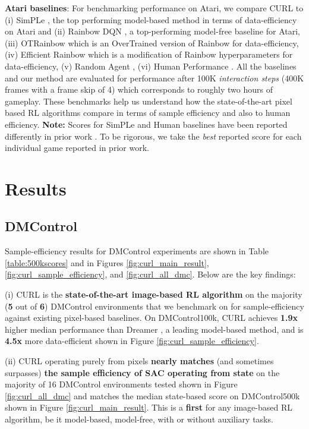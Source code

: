 \documentclass{article}
\begin{document}
\textbf{Atari baselines}: For benchmarking performance on Atari, we compare CURL to (i) SimPLe \cite{kaiser2019model}, the top performing model-based method in terms of data-efficiency on Atari and (ii) Rainbow DQN \cite{hessel2017rainbow}, a top-performing model-free baseline for Atari, (iii) OTRainbow \cite{kielak2020rainbow} which is an OverTrained version of Rainbow for data-efficiency, (iv) Efficient Rainbow \cite{van2019use} which is a modification of Rainbow hyperparameters for data-efficiency, (v) Random Agent \cite{kaiser2019model}, (vi) Human Performance \cite{kaiser2019model, van2019use}. All the baselines and our method are evaluated for performance after 100K {\it interaction steps} (400K frames with a frame skip of 4) which corresponds to roughly two hours of gameplay. These benchmarks help us understand how the state-of-the-art pixel based RL algorithms compare in terms of sample efficiency and also to human efficiency. {\textbf{Note:}} Scores for SimPLe and Human baselines have been reported differently in prior work \cite{kielak2020rainbow, van2019use}. To be rigorous, we take the {\it best} reported score for each individual game reported in prior work. 

 \section{Results}
\subsection{DMControl} Sample-efficiency results for DMControl experiments are shown in Table \ref{table:500kscores} and in Figures \ref{fig:curl_main_result}, \ref{fig:curl_sample_efficiency}, and \ref{fig:curl_all_dmc}. Below are the key findings:

(i) CURL is the \textbf{state-of-the-art image-based RL algorithm} on the majority (\textbf{5} out of \textbf{6}) DMControl environments that we benchmark on for sample-efficiency against existing pixel-based baselines. On DMControl100k, CURL achieves {\textbf{1.9x}} higher median performance than Dreamer \cite{hafner2019dream}, a leading model-based method, and is {\textbf{4.5x}} more data-efficient shown in Figure \ref{fig:curl_sample_efficiency}.

(ii) CURL operating purely from pixels {\textbf{nearly matches} (and sometimes surpasses) \textbf{the sample efficiency of SAC operating from state}} on the majority of 16 DMControl environments tested shown in Figure \ref{fig:curl_all_dmc} and matches the median state-based score on DMControl500k shown in Figure \ref{fig:curl_main_result}. This is a {\textbf{first}} for any image-based RL algorithm, be it model-based, model-free, with or without auxiliary tasks.
\end{document}
